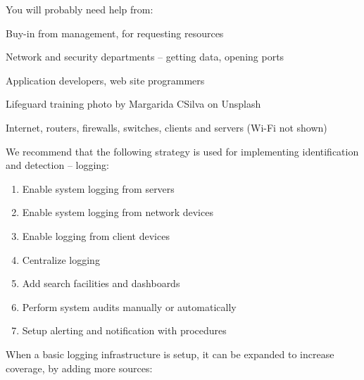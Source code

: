 \documentclass[Screen16to9,17pt]{foils}
\begin{document}


You will probably need help from:

\begin{list2}
\item Buy-in from management, for requesting resources
\item Network and security departments -- getting data, opening ports
\item Application developers, web site programmers
\end{list2}
Lifeguard training photo by Margarida CSilva on Unsplash




\begin{quote}

\end{quote}

\begin{list2}
\item Internet, routers, firewalls, switches, clients and servers (Wi-Fi not shown)
\end{list2}



We recommend that the following strategy is used for implementing identification and detection -- logging:
\begin{enumerate}
\item[\faSquareO] Enable system logging from servers
\item[\faSquareO] Enable system logging from network devices
\item[\faSquareO] Enable logging from client devices
\item[\faSquareO] Centralize logging
\item[\faSquareO] Add search facilities and dashboards
\item[\faSquareO] Perform system audits manually or automatically
\item[\faSquareO] Setup alerting and notification with procedures
\end{enumerate}

When a basic logging infrastructure is setup, it can be expanded to increase coverage, by
adding more sources:
\end{document}
